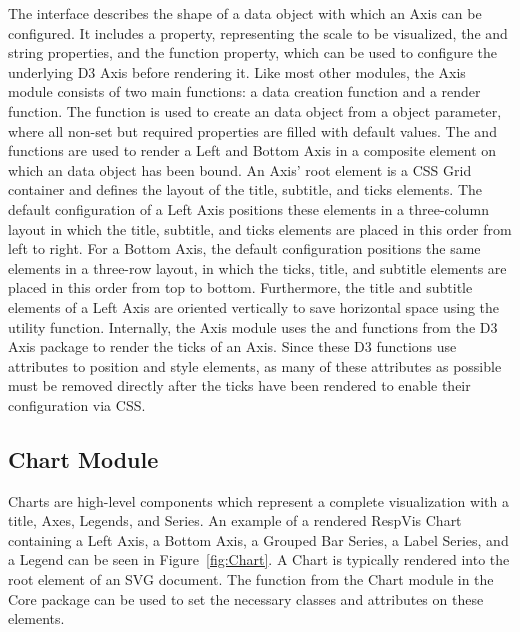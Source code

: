 The  interface describes the shape of a data object with
which an Axis can be configured. It includes a  property,
representing the scale to be visualized, the  and
 string properties, and the 
function property, which can be used to configure the underlying D3
Axis before rendering it. Like most other modules, the Axis module
consists of two main functions: a data creation function and a render
function. The  function is used to create an
 data object from a  object parameter,
where all non-set but required properties are filled with default
values. The  and 
functions are used to render a Left and Bottom Axis in a composite
element on which an  data object has been bound. An Axis'
root element is a CSS Grid container and defines the layout of the
title, subtitle, and ticks elements. The default configuration of a
Left Axis positions these elements in a three-column layout in which
the title, subtitle, and ticks elements are placed in this order from
left to right. For a Bottom Axis, the default configuration positions
the same elements in a three-row layout, in which the ticks, title,
and subtitle elements are placed in this order from top to bottom.
Furthermore, the title and subtitle elements of a Left Axis are
oriented vertically to save horizontal space using the
 utility function. Internally, the Axis module
uses the  and  functions from the D3
Axis package \parencite{D3Axis} to render the ticks of an Axis. Since
these D3 functions use attributes to position and style elements, as
many of these attributes as possible must be removed directly after
the ticks have been rendered to enable their configuration via CSS.






\subsection{Chart Module}
\label{sec:Chart}

Charts are high-level components which represent a complete
visualization with a title, Axes, Legends, and Series. An example of a rendered
RespVis Chart containing a Left Axis, a Bottom Axis, a Grouped Bar
Series, a Label Series, and a Legend can be seen in
Figure~\ref{fig:Chart}. A Chart is typically rendered into the root
 element of an SVG document. The 
function from the  Chart module in the Core
package can be used to set the necessary classes and attributes on
these  elements.



